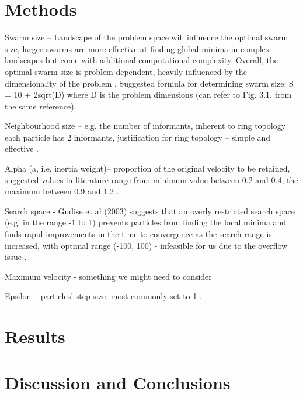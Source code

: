 \documentclass[12pt]{article}
\begin{document}
\vspace{-1.5em}
\section{Methods}


Swarm size – Landscape of the problem space will influence the optimal swarm size, larger swarms are more effective at finding global minima in complex landscapes but come with additional computational complexity. Overall, the optimal swarm size is problem-dependent, heavily influenced by the dimensionality of the problem \cite{Razee}. Suggested formula for determining swarm size: S = 10 + 2sqrt(D) where D is the problem dimensions (can refer to Fig. 3.1. from the same reference)\cite{Clerc}.

Neighbourhood size – e.g. the number of informants, inherent to ring topology each particle has 2 informants, justification for ring topology – simple and effective \cite{Clerc}.

Alpha (a, i.e. inertia weight)– proportion of the original velocity to be retained, suggested values in literature range from minimum value between 0.2 and 0.4, the maximum between 0.9 and 1.2 \cite{Razee} \cite{Gudise}.

Search space - Gudise et al (2003) suggests that an overly restricted search space (e.g. in the range -1 to 1) prevents particles from finding the local minima and finds rapid improvements in the time to convergence as the search range is increased, with  optimal range (-100, 100) - infeasible for us due to the overflow issue \cite{Gudise}.

Maximum velocity - something we might need to consider

Epsilon – particles' step size, most commonly set to 1 \cite{Luke}.


\vspace{-1.5em}
\section{Results}



\vspace{-1.5em}
\section{Discussion and Conclusions}
\vspace{-1.5em}
\end{document}
